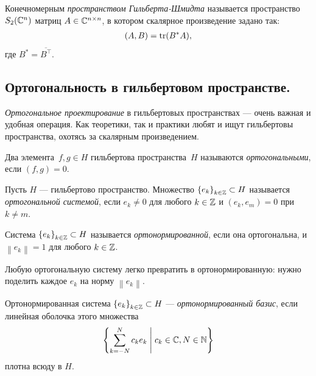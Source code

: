 \documentclass[../complex-analysis.tex]{subfiles}
\begin{document}
\begin{exmpl}
 Конечномерным \emph{пространством Гильберта-Шмидта} называется пространство~$ S_2(\mathbb{C}^{n}) $  матриц $ A \in \mathbb{C}^{n \times n} $, в котором скалярное произведение задано так:
 \begin{align*}
  (A,B) = \operatorname{tr} (B^{\ast}A),
 \end{align*} где $ B^{\ast} = \overline{B^{\top}} $.
\end{exmpl}

\subsection{Ортогональность в гильбертовом пространстве.}

\textit{Ортогональное проектирование} в гильбертовых пространствах --- очень важная и удобная операция. Как теоретики, так и практики любят и ищут гильбертовы пространства, охотясь за скалярным произведением.

\begin{df}
 Два элемента~$ f,g \in H $ гильбертова пространства~$ H $ называются \emph{ортогональными}, если $ (f,g) = 0 $.
\end{df}
\begin{df}
 Пусть $ H $ --- гильбертово пространство. Множество $ \left\{e_k\right\}_{k \in \mathbb{Z}} \subset H  $ называется \textit{ортогональной системой}, если $ e_k \neq 0 $ для любого $ k \in \mathbb{Z} $ и $ (e_k, e_m) = 0 $ при $ k \neq m $.
\end{df}
\begin{df}
 Система $ \left\{e_k\right\}_{k \in \mathbb{Z}} \subset H  $ называется \textit{ортонормированной}, если она ортогональна, и $\left\| e_k \right\|=1$ для любого $ k \in \mathbb{Z} $.
\end{df}
Любую ортогональную систему легко превратить в ортонормированную: нужно поделить каждое $ e_k $ на норму $ \left\| e_k \right\| $.
\begin{df}
 Ортонормированная система $ \left\{e_k\right\}_{k\in\mathbb{Z}}  \subset H $ --- \textit{ортонормированный базис}, если линейная оболочка этого множества
 \begin{align*}
  \left\{ \sum_{k=-N}^{N} c_k e_k \;\middle|\; c_k \in \mathbb{C}, N \in \mathbb{N} \right\}
 \end{align*} плотна всюду в $ H $.
\end{df}
\end{document}
